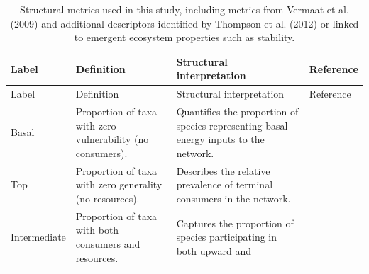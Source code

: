 \documentclass[
]{article}
\begin{document}
\begin{longtable}[]{@{}
  >{\raggedright\arraybackslash}p{}
  >{\raggedright\arraybackslash}p{}
  >{\raggedright\arraybackslash}p{}
  >{\raggedright\arraybackslash}p{}@{}}
\caption{Structural metrics used in this study, including metrics from
Vermaat et al. (2009) and additional descriptors identified by Thompson
et al. (2012) or linked to emergent ecosystem properties such as
stability.}\label{tbl-properties}\tabularnewline
\toprule\noalign{}
\begin{minipage}[b]{\linewidth}\raggedright
Label
\end{minipage} & \begin{minipage}[b]{\linewidth}\raggedright
Definition
\end{minipage} & \begin{minipage}[b]{\linewidth}\raggedright
Structural interpretation
\end{minipage} & \begin{minipage}[b]{\linewidth}\raggedright
Reference
\end{minipage} \\
\midrule\noalign{}
\endfirsthead
\toprule\noalign{}
\begin{minipage}[b]{\linewidth}\raggedright
Label
\end{minipage} & \begin{minipage}[b]{\linewidth}\raggedright
Definition
\end{minipage} & \begin{minipage}[b]{\linewidth}\raggedright
Structural interpretation
\end{minipage} & \begin{minipage}[b]{\linewidth}\raggedright
Reference
\end{minipage} \\
\midrule\noalign{}
\endhead
\bottomrule\noalign{}
\endlastfoot
Basal & Proportion of taxa with zero vulnerability (no consumers). &
Quantifies the proportion of species representing basal energy inputs to
the network. & \\
Top & Proportion of taxa with zero generality (no resources). &
Describes the relative prevalence of terminal consumers in the network.
& \\
Intermediate & Proportion of taxa with both consumers and resources. &
Captures the proportion of species participating in both upward and

\end{longtable}
\end{document}
